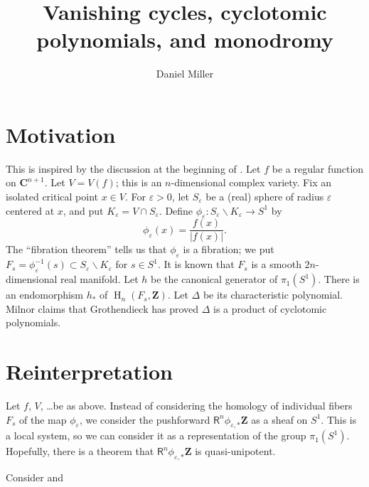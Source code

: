 \documentclass{article}
\title{Vanishing cycles, cyclotomic polynomials, and monodromy}
\author{Daniel Miller}
\DeclareMathOperator{\h}{H}
\newcommand{\dC}{\mathbf{C}}
\newcommand{\dZ}{\mathbf{Z}}
\begin{document}
\maketitle





\section{Motivation}

This is inspired by the discussion at the beginning of \cite[\S 9]{mi68}. Let 
$f$ be a regular function on $\dC^{n+1}$. Let $V=V(f)$; this is an 
$n$-dimensional complex variety. Fix an isolated critical point $x\in V$. For 
$\varepsilon>0$, let $S_\varepsilon$ be a (real) sphere of radius $\varepsilon$ 
centered at $x$, and put $K_\varepsilon = V\cap S_\varepsilon$. Define 
$\phi_\varepsilon:S_\varepsilon\smallsetminus K_\varepsilon \to S^1$ by 
\[
  \phi_\varepsilon(x) = \frac{f(x)}{|f(x)|} .
\]
The ``fibration theorem'' tells us that $\phi_\varepsilon$ is a fibration; we 
put 
$F_s = \phi_\varepsilon^{-1}(s)\subset S_\varepsilon\smallsetminus K_\varepsilon$ 
for $s\in S^1$. It is known that $F_s$ is a smooth $2n$-dimensional real 
manifold. Let $h$ be the canonical generator of $\pi_1(S^1)$. There is an 
endomorphism $h_\ast$ of $\h_n(F_s,\dZ)$. Let $\Delta$ be its characteristic 
polynomial. Milnor claims that Grothendieck has proved $\Delta$ is a product of 
cyclotomic polynomials. 





\section{Reinterpretation}

Let $f$, $V$, \ldots be as above. Instead of considering the homology of 
individual fibers $F_s$ of the map $\phi_\varepsilon$, we consider the  
pushforward $\mathsf R^n \phi_{\varepsilon,\ast} \dZ$ as a sheaf on $S^1$. This 
is a local system, so we can consider it as a representation of the group 
$\pi_1(S^1)$. Hopefully, there is a theorem that 
$\mathsf R^n \phi_{\varepsilon,\ast} \dZ$ is quasi-unipotent. 

Consider \cite{sga7-i} and \cite{sga7-ii}







\end{document}
